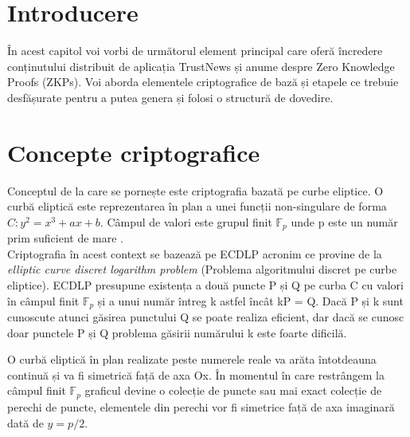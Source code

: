 
\section{Introducere}

În acest capitol voi vorbi de următorul element principal care oferă încredere conținutului distribuit de aplicația TrustNews și anume despre Zero Knowledge Proofs (ZKPs).
Voi aborda elementele criptografice de bază și etapele ce trebuie desfășurate pentru a putea genera și folosi o structură de dovedire.\\

\section{Concepte criptografice}

Conceptul de la care se pornește este criptografia bazată pe curbe eliptice. 
O curbă eliptică este reprezentarea în plan a unei funcții non-singulare de forma $C: y^2 = x^3 + ax +b$.
Câmpul de valori este grupul finit $\mathbb{F}_p$ unde p este un număr prim suficient de mare \cite{ZKS_Crypto_Basic}.\\

Criptografia în acest context se bazează pe ECDLP acronim ce provine de la \textit{elliptic curve discret logarithm problem} (Problema algoritmului discret pe curbe eliptice).
ECDLP presupune existența a două puncte P și Q pe curba C cu valori în câmpul finit $\mathbb{F}_p$ și a unui număr întreg k astfel încât kP = Q.
Dacă P și k sunt cunoscute atunci găsirea punctului Q se poate realiza eficient, dar dacă se cunosc doar punctele P și Q problema găsirii numărului k este foarte dificilă.\\

\clearpage

O curbă eliptică în plan realizate peste numerele reale va arăta întotdeauna continuă și va fi simetrică față de axa Ox.
În momentul în care restrângem la câmpul finit $\mathbb{F}_p$ graficul devine o colecție de puncte sau mai exact colecție de perechi de puncte, elementele din perechi vor fi simetrice față de axa imaginară dată de $y = p/2$.


